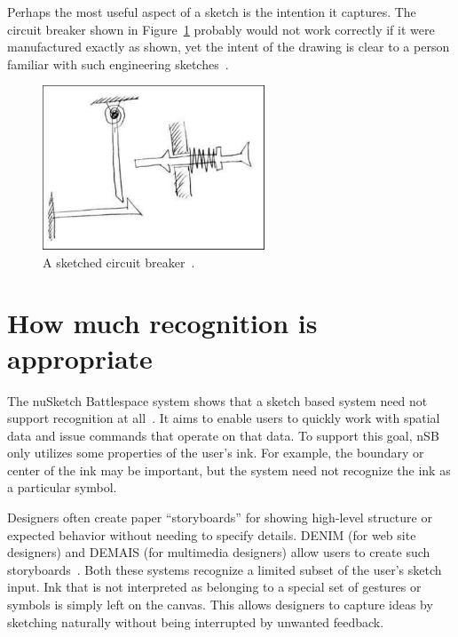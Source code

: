 Perhaps the most useful aspect of a sketch is the intention it
captures. The circuit breaker shown in
Figure~\ref{fig:circuit-breaker} probably would not work correctly if
it were manufactured exactly as shown, yet the intent of the drawing
is clear to a person familiar with such engineering
sketches~\cite{stahovich-sketchit-diagram}.

\begin{figure}
\begin{center}
  \includegraphics[angle=0, origin=c, width=2.6in]{img/circuit-breaker.pdf}
  \caption{A sketched circuit breaker~\cite{stahovich-sketchit-diagram}.}
  \label{fig:circuit-breaker}
\end{center}
\end{figure}

\section{How much recognition is appropriate}
\label{sec:recognition-how-much}

The nuSketch Battlespace system shows that a sketch based system need
not support recognition at all~\cite{forbus-nusketch-battlespace}. It
aims to enable users to quickly work with spatial data and issue
commands that operate on that data. To support this goal, nSB only
utilizes some properties of the user's ink. For example, the boundary
or center of the ink may be important, but the system need not
recognize the ink as a particular symbol.

Designers often create paper ``storyboards'' for showing high-level
structure or expected behavior without needing to specify
details. DENIM (for web site designers) and DEMAIS (for multimedia
designers) allow users to create such
storyboards~\cite{lin-denim,bailey-demais}. Both these systems
recognize a limited subset of the user's sketch input. Ink that is not
interpreted as belonging to a special set of gestures or symbols is
simply left on the canvas. This allows designers to capture ideas by
sketching naturally without being interrupted by unwanted feedback.

